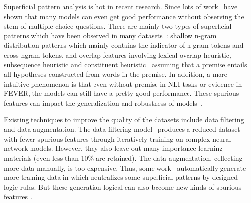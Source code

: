 Superficial pattern analysis is hot in recent research. Since 
lots of work~\cite{} 
have shown that many models can even 
get good performance without observing the stem of  multiple choice questions.
There are mainly two types of superficial patterns which have been observed in many datasets~\cite{}: 
shallow n-gram distribution patterns which mainly contains the indicator of n-gram tokens and cross-ngram tokens.
and overlap features involving  lexical overlap heuristic, 
subsequence heuristic and constituent heuristic~\cite{} 
assuming that a premise entails all
hypotheses constructed from words
in the premise. In addition, a more 
intuitive phenomenon is that even without premise in NLI tasks or evidence in FEVER, 
the models can still have a pretty good performance. These spurious features can 
impact the generalization and robustness of models~\cite{}.

Existing techniques to improve the quality of the datasets 
include data filtering and data augmentation.  
The data filtering model~\cite{bras2020adversarial} 
produces a reduced dataset with fewer spurious features through iteratively 
training on complex neural network models. 
However, they also leave out many
 importance learning materials (even less than 10\% are retained). 
The data augmentation, collecting more data manually,
is too expensive. Thus, some work~\cite{} automatically generate 
more training data in which neutralizes some 
superficial patterns by designed logic rules. 
But these generation logical can also become new kinds of spurious features~\cite{}.

